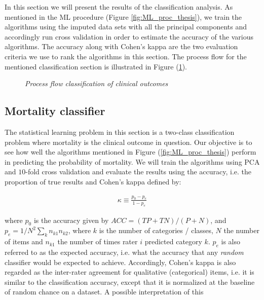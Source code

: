 \documentclass[../thesis.tex]{subfiles}
\begin{document}
\noindent In this section we will present the results of the classification analysis. As mentioned in the ML procedure (Figure \ref{fig:ML_proc_thesis}), we train the algorithms using the imputed data sets with all the principal components and accordingly run cross validation in order to estimate the accuracy of the various algorithms. The accuracy along with Cohen’s kappa are the two evaluation criteria we use to rank the algorithms in this section. The process flow for the mentioned classification section is illustrated in Figure (\ref{fig:process_flow_classification}). 

\begin{figure}[!t]
    \centering
    
    \caption[Process flow classification of clinical outcomes]{\textit{Process flow classification of clinical outcomes}}
    \label{fig:process_flow_classification}
\end{figure}

\subsection{Mortality classifier}

\noindent The statistical learning problem in this section is a two-class classification problem where mortality is the clinical outcome in question. Our objective is to see how well the algorithms mentioned in Figure (\ref{fig:ML_proc_thesis}) perform in predicting the probability of mortality. We will train the algorithms using PCA and $10$-fold cross validation and evaluate the results using the accuracy, i.e. the proportion of true results and Cohen's kappa defined by:

\begin{align}
    \kappa \equiv \frac{p_0 - p_e}{1 - p_e}
\end{align}

\noindent where $p_0$ is the accuracy given by ${\mathit  {ACC}}=({\mathit  {TP}}+{\mathit  {TN}})/(P+N)$, and $p_e = 1 / N^2 \sum_{k} n_{k1}n_{k2}$, where $k$ is the number of categories / classes, $N$ the number of items and $n_{k1}$ the number of times rater $i$ predicted category $k$. $p_e$ is also referred to as the expected accuracy, i.e. what the accuracy that any \textit{random} classifier would be expected to achieve. Accordingly, Cohen's kappa is also regarded as the inter-rater agreement for qualitative (categorical) items, i.e. it is similar to the classification accuracy, except that it is normalized at the baseline of random chance on a dataset. A possible interpretation of this    
\end{document}
